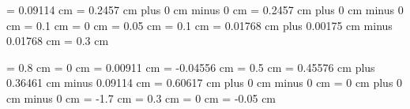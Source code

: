 \gre@additionalcustoslineswidth = 0.09114 cm
\gre@afterinitialshift = 0.2457 cm plus 0 cm minus 0 cm
\gre@beforeinitialshift = 0.2457 cm plus 0 cm minus 0 cm
\gre@minimalspaceatlinebeginning = 0.1 cm
\gre@manualinitialwidth = 0 cm
\gre@aboveinitialseparation = 0.05 cm
\gre@noclefspace = 0.1 cm
\gre@clefchangespace = 0.01768 cm plus 0.00175 cm minus 0.01768 cm%
\gre@clivisalignmentmin = 0.3 cm




\gre@abovesignsspace = 0.8 cm
\gre@belowsignsspace = 0 cm
\gre@lowchoralsignshift = 0.00911 cm
\gre@highchoralsignshift = -0.04556 cm
\gre@translationheight = 0.5 cm
\gre@spaceabovelines = 0.45576 cm plus 0.36461 cm minus 0.09114 cm
\gre@spacelinestext = 0.60617 cm plus 0 cm minus 0 cm
\gre@spacebeneathtext = 0 cm plus 0 cm minus 0 cm
\gre@abovelinestextraise = -1.7 cm%
\gre@abovelinestextheight = 0.3 cm%
\gre@braceshift = 0 cm
\gre@curlybraceaccentusshift = -0.05 cm

